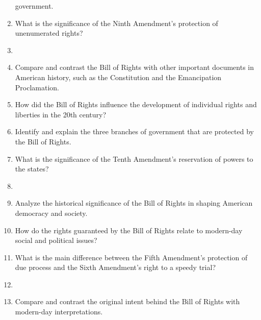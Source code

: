 \documentclass{article}
\begin{document}
\begin{enumerate}
government. \vspace{2cm} \item What is the significance of the Ninth Amendment's protection of unenumerated rights? \vspace{2cm} \item {} \vspace{2cm} \item Compare and contrast the Bill of Rights with other important documents in American history, such as the Constitution and the Emancipation Proclamation. \vspace{2cm} \item How did the Bill of Rights influence the development of individual rights and liberties in the 20th century? \vspace{2cm} \item Identify and explain the three branches of government that are protected by the Bill of Rights. \vspace{2cm} \item What is the significance of the Tenth Amendment's reservation of powers to the states? \vspace{2cm} \item {} \vspace{2cm} \item Analyze the historical significance of the Bill of Rights in shaping American democracy and society. \vspace{2cm} \item How do the rights guaranteed by the Bill of Rights relate to modern-day social and political issues? \vspace{2cm} \item What is the main difference between the Fifth Amendment's protection of due process and the Sixth Amendment's right to a speedy trial? \vspace{2cm} \item {} \vspace{2cm} \item Compare and contrast the original intent behind the Bill of Rights with modern-day interpretations. 
\end{enumerate}
\end{document}
